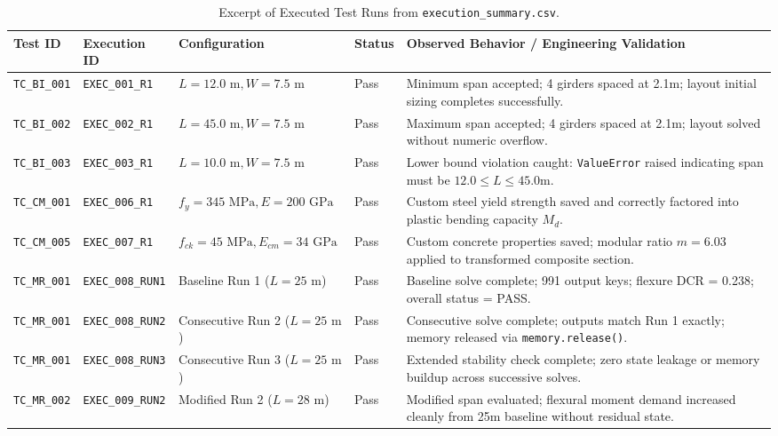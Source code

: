 \begin{table}[htbp]
    \centering
    \scriptsize
    \caption{Excerpt of Executed Test Runs from \texttt{execution\_summary.csv}.}
    \label{tab:execution_tracking}
    \begin{tabularx}{\textwidth}{llllX}
        \toprule
        \textbf{Test ID} & \textbf{Execution ID} & \textbf{Configuration} & \textbf{Status} & \textbf{Observed Behavior / Engineering Validation} \\
        \midrule
        \texttt{TC\_BI\_001} & \texttt{EXEC\_001\_R1} & $L = 12.0\text{ m}, W = 7.5\text{ m}$ & Pass & Minimum span accepted; 4 girders spaced at 2.1m; layout initial sizing completes successfully. \\
        \texttt{TC\_BI\_002} & \texttt{EXEC\_002\_R1} & $L = 45.0\text{ m}, W = 7.5\text{ m}$ & Pass & Maximum span accepted; 4 girders spaced at 2.1m; layout solved without numeric overflow. \\
        \texttt{TC\_BI\_003} & \texttt{EXEC\_003\_R1} & $L = 10.0\text{ m}, W = 7.5\text{ m}$ & Pass & Lower bound violation caught: \texttt{ValueError} raised indicating span must be $12.0\le L\le 45.0$m. \\
        \texttt{TC\_CM\_001} & \texttt{EXEC\_006\_R1} & $f_y=345\text{ MPa}, E=200\text{ GPa}$ & Pass & Custom steel yield strength saved and correctly factored into plastic bending capacity $M_d$. \\
        \texttt{TC\_CM\_005} & \texttt{EXEC\_007\_R1} & $f_{ck}=45\text{ MPa}, E_{cm}=34\text{ GPa}$ & Pass & Custom concrete properties saved; modular ratio $m = 6.03$ applied to transformed composite section. \\
        \texttt{TC\_MR\_001} & \texttt{EXEC\_008\_RUN1} & Baseline Run 1 ($L=25\text{ m}$) & Pass & Baseline solve complete; 991 output keys; flexure DCR = 0.238; overall status = PASS. \\
        \texttt{TC\_MR\_001} & \texttt{EXEC\_008\_RUN2} & Consecutive Run 2 ($L=25\text{ m}$) & Pass & Consecutive solve complete; outputs match Run 1 exactly; memory released via \texttt{memory.release()}. \\
        \texttt{TC\_MR\_001} & \texttt{EXEC\_008\_RUN3} & Consecutive Run 3 ($L=25\text{ m}$) & Pass & Extended stability check complete; zero state leakage or memory buildup across successive solves. \\
        \texttt{TC\_MR\_002} & \texttt{EXEC\_009\_RUN2} & Modified Run 2 ($L=28\text{ m}$) & Pass & Modified span evaluated; flexural moment demand increased cleanly from 25m baseline without residual state. \\

\end{tabularx}
\end{table}
